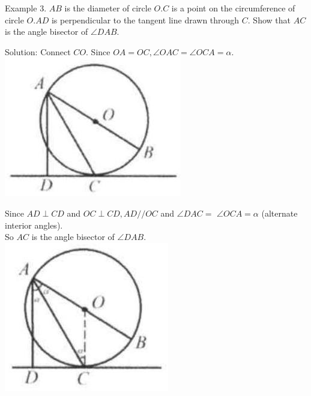 \documentclass[10pt]{article}
\begin{document}
Example 3. \(A B\) is the diameter of circle \(O . C\) is a point on the circumference of circle \(O . A D\) is perpendicular to the tangent line drawn through \(C\). Show that \(A C\) is the angle bisector of \(\angle D A B\).

Solution:
Connect \(C O\). Since \(O A=O C, \angle O A C=\angle O C A=\alpha\).\\
\includegraphics[max width=\textwidth, center]{2025_04_17_97bc1f7e44d93c271a88g-148(4)}

Since \(A D \perp C D\) and \(O C \perp C D, A D / / O C\) and \(\angle D A C=\) \(\angle O C A=\alpha\) (alternate interior angles).\\
So \(A C\) is the angle bisector of \(\angle D A B\).\\
\includegraphics[max width=\textwidth, center]{2025_04_17_97bc1f7e44d93c271a88g-148(1)}
\end{document}
